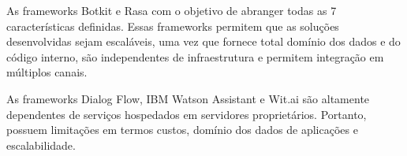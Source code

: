 As frameworks Botkit e Rasa com o objetivo de abranger todas as 7 características definidas. Essas frameworks permitem que as soluções desenvolvidas sejam escaláveis, uma vez que fornece total domínio dos dados e do código interno, são independentes de infraestrutura e permitem integração em múltiplos canais. 

As frameworks Dialog Flow, IBM Watson Assistant e Wit.ai são altamente dependentes de serviços hospedados em servidores proprietários. Portanto, possuem limitações em termos custos, domínio dos dados de aplicações e escalabilidade. 




